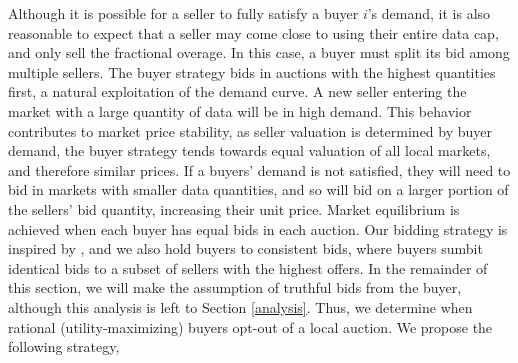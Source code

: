 \documentclass[sigconf, anonymous]{acmart}
\theoremstyle{definition}
\begin{document}
Although it is possible for a seller to fully satisfy a buyer $i$'s demand, it
is also reasonable to expect that a seller may come close to using their
entire data cap, and only sell the fractional overage. In this case, a buyer
must split its bid among multiple sellers. 
The buyer strategy bids in auctions with the highest quantities first,
a natural exploitation of the demand curve. A new seller entering the market
with a large quantity of data will be in high demand. This behavior contributes to market price
stability, as seller valuation is determined by buyer demand, the
buyer strategy tends towards equal valuation of all local markets, and therefore
similar prices. If a buyers' demand is not satisfied, they will need to bid in
markets with smaller data quantities, and so will bid on a larger portion of
the sellers' bid quantity, increasing their unit price. Market equilibrium is achieved when each buyer has equal bids in
each auction. Our bidding strategy is inspired by \cite{lazar}, and we also
hold buyers to consistent bids, where buyers sumbit identical bids to a
subset of sellers with the highest offers. In the remainder of this section, we
will make the assumption of truthful bids from the buyer, although this
analysis is left to Section \ref{analysis}.
Thus, we determine when rational (utility-maximizing) buyers opt-out of a local auction. 
We propose the following strategy, 
\end{document}
